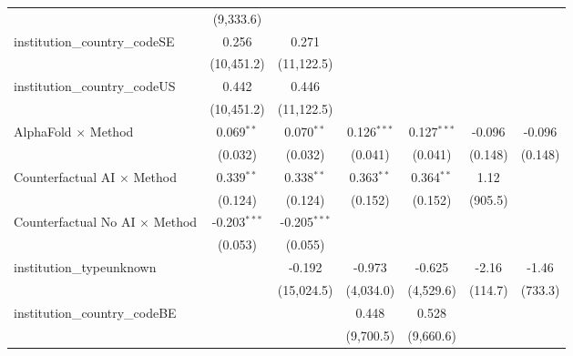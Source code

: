 \begin{tabular}{lcccccc}
                                         & (9,333.6)      &                &               &               &               &   \\   
   institution\_country\_codeSE          & 0.256          & 0.271          &               &               &               &   \\   
                                         & (10,451.2)     & (11,122.5)     &               &               &               &   \\   
   institution\_country\_codeUS          & 0.442          & 0.446          &               &               &               &   \\   
                                         & (10,451.2)     & (11,122.5)     &               &               &               &   \\   
   AlphaFold $\times$ Method             & 0.069$^{**}$   & 0.070$^{**}$   & 0.126$^{***}$ & 0.127$^{***}$ & -0.096        & -0.096\\   
                                         & (0.032)        & (0.032)        & (0.041)       & (0.041)       & (0.148)       & (0.148)\\   
   Counterfactual AI $\times$ Method     & 0.339$^{**}$   & 0.338$^{**}$   & 0.363$^{**}$  & 0.364$^{**}$  & 1.12          &   \\   
                                         & (0.124)        & (0.124)        & (0.152)       & (0.152)       & (905.5)       &   \\   
   Counterfactual No AI $\times$ Method  & -0.203$^{***}$ & -0.205$^{***}$ &               &               &               &   \\   
                                         & (0.053)        & (0.055)        &               &               &               &   \\   
   institution\_typeunknown              &                & -0.192         & -0.973        & -0.625        & -2.16         & -1.46\\   
                                         &                & (15,024.5)     & (4,034.0)     & (4,529.6)     & (114.7)       & (733.3)\\   
   institution\_country\_codeBE          &                &                & 0.448         & 0.528         &               &   \\   
                                         &                &                & (9,700.5)     & (9,660.6)     &               &   \\   

\end{tabular}

